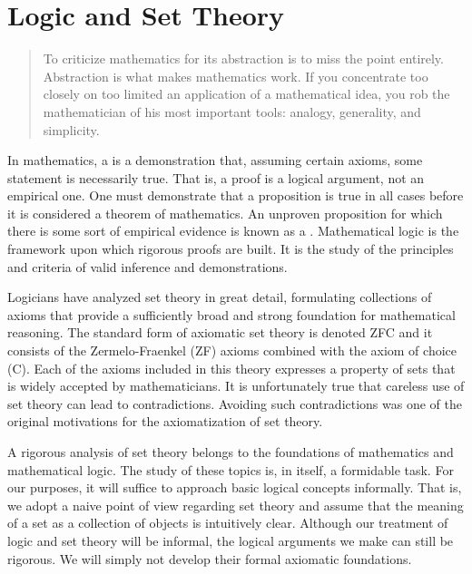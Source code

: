 \chapter{Logic and Set Theory}\label{chapter:LogicAndSetTheory}

\begin{quote}
To criticize mathematics for its abstraction is to miss the point entirely.
Abstraction is what makes mathematics work.
If you concentrate too closely on too limited an application of a mathematical idea, you rob the mathematician of his most important tools: analogy, generality, and simplicity.
\end{quote}


In mathematics, a  is a demonstration that, assuming certain axioms, some statement is necessarily true.
That is, a proof is a logical argument, not an empirical one.
One must demonstrate that a proposition is true in all cases before it is considered a theorem of mathematics.
An unproven proposition for which there is some sort of empirical evidence is known as a .
Mathematical logic is the framework upon which rigorous proofs are built.
It is the study of the principles and criteria of valid inference and demonstrations.

Logicians have analyzed set theory in great detail, formulating collections of axioms that provide a sufficiently broad and strong foundation for mathematical reasoning.
The standard form of axiomatic set theory is denoted ZFC and it consists of the Zermelo-Fraenkel (ZF) axioms combined with the axiom of choice (C).
Each of the axioms included in this theory expresses a property of sets that is widely accepted by mathematicians.
It is unfortunately true that careless use of set theory can lead to contradictions.
Avoiding such contradictions was one of the original motivations for the axiomatization of set theory.

A rigorous analysis of set theory belongs to the foundations of mathematics and mathematical logic.
The study of these topics is, in itself, a formidable task.
For our purposes, it will suffice to approach basic logical concepts informally.
That is, we adopt a naive point of view regarding set theory and assume that the meaning of a set as a collection of objects is intuitively clear.
Although our treatment of logic and set theory will be informal, the logical arguments we make can still be rigorous.
We will simply not develop their formal axiomatic foundations.

